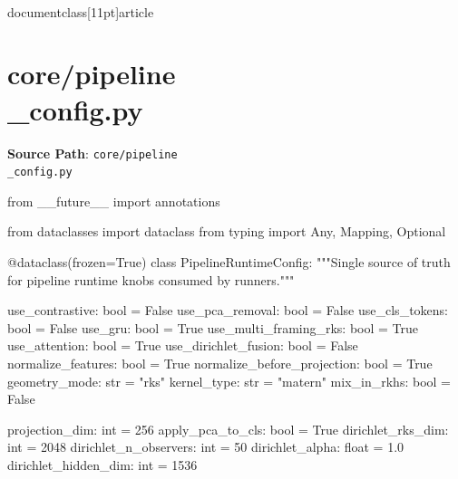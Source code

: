 \\documentclass[11pt]{article}
\begin{document}
\section*{core/pipeline\\_config.py}
\textbf{Source Path}: \texttt{core/pipeline\\_config.py}\par
\bigskip
\begin{CodeBlock}
from __future__ import annotations

from dataclasses import dataclass
from typing import Any, Mapping, Optional


@dataclass(frozen=True)
class PipelineRuntimeConfig:
    """Single source of truth for pipeline runtime knobs consumed by runners."""

    use_contrastive: bool = False
    use_pca_removal: bool = False
    use_cls_tokens: bool = False
    use_gru: bool = True
    use_multi_framing_rks: bool = True
    use_attention: bool = True
    use_dirichlet_fusion: bool = False
    normalize_features: bool = True
    normalize_before_projection: bool = True
    geometry_mode: str = "rks"
    kernel_type: str = "matern"
    mix_in_rkhs: bool = False

    projection_dim: int = 256
    apply_pca_to_cls: bool = True
    dirichlet_rks_dim: int = 2048
    dirichlet_n_observers: int = 50
    dirichlet_alpha: float = 1.0
    dirichlet_hidden_dim: int = 1536


\end{CodeBlock}
\end{document}
